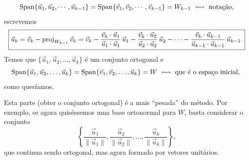 \begin{equation}
\operatorname{Span} \{ \vec{u}_1, \vec{u}_2, \cdots, \vec{u}_{k-1} \} = \operatorname{Span} \{ \vec{v}_1, \vec{v}_2, \cdots, \vec{v}_{k-1} \} = W_{k-1} \ \leftrightsquigarrow \text{ notação,}
\end{equation} escrevemos
\begin{equation}
\boxed{\vec{u}_k = \vec{v}_k - \operatorname{proj}_{W_{k-1}} \vec{v}_k = \vec{v}_k - \frac{\vec{v}_k \cdot \vec{u}_1}{\vec{u}_1 \cdot \vec{u}_1} \, \vec{u}_1 - \frac{\vec{v}_k \cdot \vec{u}_2}{\vec{u}_2 \cdot \vec{u}_2} \, \vec{u}_2 - \cdots - \frac{\vec{v}_k \cdot \vec{u}_{k-1}}{\vec{u}_{k-1} \cdot \vec{u}_{k-1}} \, \vec{u}_{k-1}.}
\end{equation} Temos que $\{\vec{u}_1, \vec{u}_2, \dots, \vec{u}_k\}$ é um conjunto ortogonal e
\begin{equation}
\operatorname{Span} \{ \vec{u}_1, \vec{u}_2, \dots, \vec{u}_k \} = \operatorname{Span} \{ \vec{v}_1, \vec{v}_2, \dots, \vec{u}_k \} = W \ \leftrightsquigarrow \text{ que é o espaço inicial, }
\end{equation} como queríamos.

Esta parte (obter o conjunto ortogonal) é a mais ``pesada'' do método. Por exemplo, se agora quiséssemos uma base ortonormal para $W$, basta considerar o conjunto
\begin{equation}
\left\{ \frac{\vec{u}_1}{\|\vec{u}_1\|}, \frac{\vec{u}_2}{\|\vec{u}_2\|}, \dots, \frac{\vec{u}_k}{\|\vec{u}_k\|} \right\},
\end{equation} que continua sendo ortogonal, mas agora formado por vetores unitários.





